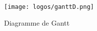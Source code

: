 \begin{figure}[h]
    \centering
    \texttt{[image: logos/ganttD.png]}
    \caption{Diagramme de Gantt}
    \label{fig:enter-label}
\end{figure}